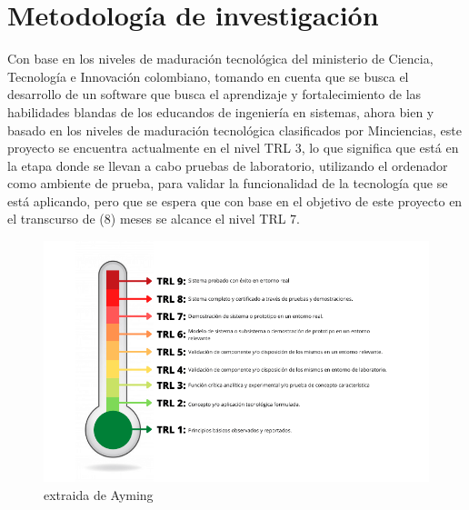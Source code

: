 \section{Metodología de investigación}
Con base en los niveles de maduración tecnológica del ministerio de Ciencia, Tecnología e Innovación colombiano, tomando en cuenta que se busca el desarrollo de un software que busca el aprendizaje y fortalecimiento de las habilidades blandas de los educandos de ingeniería en sistemas, ahora bien y basado en los niveles de maduración tecnológica clasificados por Minciencias, este proyecto se encuentra actualmente en el nivel TRL 3, lo que significa que está en la etapa donde se llevan a cabo pruebas de laboratorio, utilizando el ordenador como ambiente de prueba, para validar la funcionalidad de la tecnología que se está aplicando, pero que se espera que con base en el objetivo de este proyecto en el transcurso de (8) meses se alcance el nivel TRL 7.\cite{o}

\begin{figure}[ht]
  \centering
  \includegraphics[width=0.8\linewidth]{Imagenes/COL.png}
  \caption{extraida de Ayming\cite{o}}
  \label{fig:imagen2}
\end{figure}
\newpage


